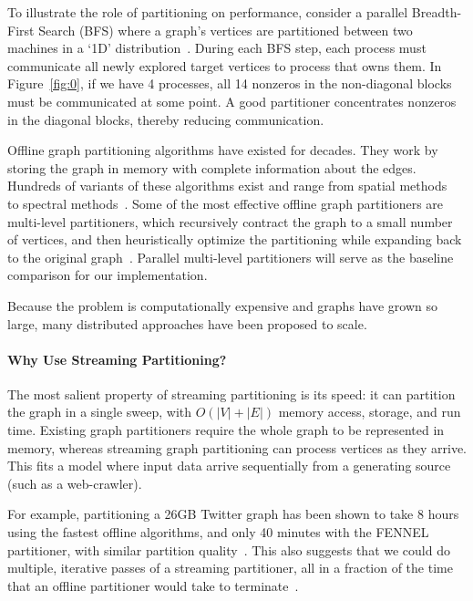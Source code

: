 To illustrate the role of partitioning on performance, consider a parallel Breadth-First Search (BFS) where a graph's vertices are partitioned between two machines in a `1D' distribution~\cite{}. During each BFS step, each process must communicate all newly explored target vertices to process that owns them. In Figure~\ref{fig:0}, if we have 4 processes, all 14 nonzeros in the non-diagonal blocks must be communicated at some point.
A good partitioner concentrates nonzeros in the diagonal blocks, thereby reducing communication.

Offline graph partitioning algorithms have existed for decades. They work by storing the graph in memory with complete information about the edges. Hundreds of variants of these algorithms exist and range from spatial methods~\cite{Gilbert95geometricmesh} to spectral methods~\cite{arora2009expander}. Some of the most effective offline graph partitioners are multi-level partitioners, which recursively contract the graph to a small number of vertices, and then heuristically optimize the partitioning while expanding back to the original graph~\cite{karypis1998multilevel}. Parallel multi-level partitioners will serve as the baseline comparison for our implementation. 



Because the problem is computationally expensive and graphs have grown so large, many distributed approaches have been proposed to scale.
 

\paragraph{Why Use Streaming Partitioning?}
The most salient property of streaming partitioning is its speed: it can partition the graph in a single sweep, with $O(|V| + |E|)$ memory access, storage, and run time. Existing graph partitioners require the whole graph to be represented in memory, whereas streaming graph partitioning can process vertices as they arrive. This fits a model where input data arrive sequentially from a generating source (such as a web-crawler).

For example, partitioning a 26GB Twitter graph has been shown to take 8 hours using the fastest offline algorithms, and only 40 minutes with the FENNEL partitioner, with similar partition quality~\cite{tsourakakis2012fennel}. This also suggests that we could do multiple, iterative passes of a streaming partitioner, all in a fraction of the time that an offline partitioner would take to terminate~\cite{nishimura2013restream}.


